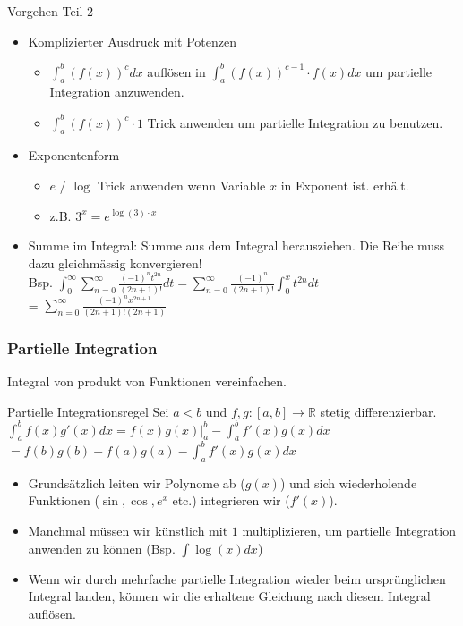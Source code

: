 \documentclass[a4paper]{article}
\newcommand\R{\ensuremath{\mathbb{R}}}
\begin{document}
\begin{howtobox}{Vorgehen Teil 2}
  \begin{itemize}[leftmargin=4.5mm, topsep=1pt, parsep=1pt]
     \item[7.]Komplizierter Ausdruck mit Potenzen
              \begin{itemize}[leftmargin=3mm]
                \item[1.] $\int_a^b (f(x))^c dx$ auflösen in $\int_a^b (f(x))^{c-1} \cdot f(x) dx$ um partielle Integration anzuwenden.
                \item[2.] $\int_a^b (f(x))^c \cdot 1$ Trick anwenden um partielle Integration
                  zu benutzen.
              \end{itemize}
    \item[8.]Exponentenform
              \begin{itemize}[leftmargin=3mm]
                \item[1.] $e$ / $\log$ Trick anwenden wenn Variable $x$ in Exponent ist. erhält.
                \item[2.] z.B. $3^x = e^{\log(3) \cdot x}$
              \end{itemize}
    \item[9.] Summe im Integral: Summe aus dem Integral herausziehen. Die Reihe muss dazu gleichmässig konvergieren! \\
              Bsp. $\int_0^{\infty} \sum_{n = 0}^{\infty} \frac{(-1)^n t^{2n}}{(2n+1)!} dt = \sum_{n=0}^{\infty} \frac{(-1)^n}{(2n+1)!} \int_{0}^x t^{2n} dt$ \\ = $\sum_{n=0}^{\infty} \frac{(-1)^n x^{2n+1}}{(2n+1)!(2n+1)}$
  \end{itemize}
\end{howtobox}

\subsubsection{Partielle Integration}
Integral von produkt von Funktionen vereinfachen.
\begin{mainbox}{Partielle Integrationsregel}
  Sei $a < b$ und $f, g: [a,b] \to \R$ stetig differenzierbar. \\
  $\int_{a}^{b} f(x)g'(x)dx = f(x)g(x)|_a^b - \int_{a}^{b} f'(x)g(x)dx$ \\ 
  \tiny \color{gray}
    $= f(b)g(b)-f(a)g(a) - \int_{a}^{b} f'(x)g(x)dx$
  \normalsize \color{black}
\end{mainbox}

\begin{itemize}[leftmargin=4.5mm, topsep=1pt, parsep=1pt]
  \item Grundsätzlich leiten wir Polynome ab ($g(x)$) und sich wiederholende Funktionen ($\sin, \cos, e^x$ etc.) integrieren wir ($f'(x)$).
  \item Manchmal müssen wir künstlich mit $1$ multiplizieren, um partielle Integration anwenden zu können (Bsp. $\int \log (x) dx$)
  \item Wenn wir durch mehrfache partielle Integration wieder beim ursprünglichen Integral landen, können wir die erhaltene Gleichung nach diesem Integral auflösen.
\end{itemize}
\end{document}
